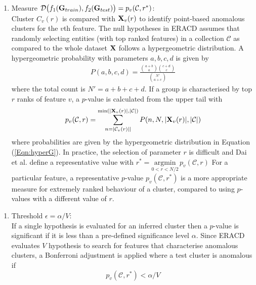 \begin{enumerate}[3.] 
\item Measure $ \mathcal{D}\big(f_1 ({\bf G}_{train}) , f_2({\bf G}_{test} )\big ) = {p}_v(\mathcal{C},r^*)$: \\
Cluster ${C}_{v} (r)$ is compared with $ { \bf X}_{v} (r) $ to  identify point-based anomalous clusters for the $v$th feature. 
 The null hypotheses in ERACD assumes that  randomly selecting  entities (with top ranked features)  in a collection $\mathcal{C}$ as compared to the whole dataset $\bf X$ follows a  hypergeometric distribution. 
A hypergeometric probability with parameters $a,b,c,d $ is given by
\begin{align}
 P(a,b,c,d) = \displaystyle \frac{ {a+b \choose{a} } { c+d \choose{c} } } { {N' \choose{a+c} } } \label{Eqn:hyperG}
\end{align} 
where the total count is $N' = a+b+c+d$. 
  If a group is characterised by top $r$ ranks of feature $v$, a $p$-value is calculated from the upper tail with  
 \[           p_v( \mathcal{C} ,r ) =  
 \displaystyle \sum_{n = |\mathcal{C}_v (r) | |} ^ {\min(| {\bf X}_v (r) |,| \mathcal{C}| )}  P (n, N,|{\bf X}_{v}  (r)|,|\mathcal{C}| ) \]
where probabilities are given by the hypergeometric distribution  in Equation (\ref{Eqn:hyperG}). In practice, the selection of parameter $r$ is difficult and Dai et al. \cite{ERACD}  define a representative value with   
$r^* = \underset { 0 < r < N/2 } { \mbox{argmin}} \,  p_v( \mathcal{C} ,r )$ %
For a particular feature,  a representative $p$-value $p_v( \mathcal{C} ,r^* )$  is a more appropriate measure for  extremely ranked behaviour of a cluster, compared to using $p$-values with a different value of $r$. %
   
\end{enumerate}
\begin{enumerate}[4.]
\item Threshold $\epsilon=\alpha/V$: \\ If a single hypothesis is evaluated for an inferred cluster  then a $p$-value is significant if it is less than  a pre-defined significance level  $\alpha$. Since ERACD evaluates $V$ hypothesis to search for features that characterise anomalous clusters,  a Bonferroni adjustment \cite{Bonferroni}  is applied where a test cluster  is anomalous if %
\[  {p}_v(\mathcal{C},r^*) < \alpha/V \]   
\end{enumerate}


